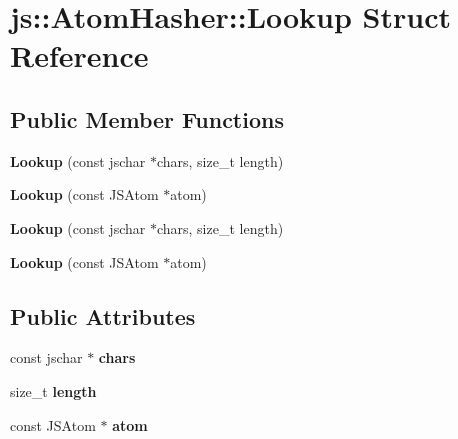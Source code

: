 \hypertarget{structjs_1_1_atom_hasher_1_1_lookup}{\section{js\-:\-:Atom\-Hasher\-:\-:Lookup Struct Reference}
\label{structjs_1_1_atom_hasher_1_1_lookup}
}
\subsection*{Public Member Functions}
\begin{DoxyCompactItemize}
\item 
\hypertarget{structjs_1_1_atom_hasher_1_1_lookup_a54651b30d62318bdf125726fd1abd328}{{\bfseries Lookup} (const jschar $\ast$chars, size\-\_\-t length)}\label{structjs_1_1_atom_hasher_1_1_lookup_a54651b30d62318bdf125726fd1abd328}

\item 
\hypertarget{structjs_1_1_atom_hasher_1_1_lookup_a5d4fc4135648abd0155831e954806b1c}{{\bfseries Lookup} (const J\-S\-Atom $\ast$atom)}\label{structjs_1_1_atom_hasher_1_1_lookup_a5d4fc4135648abd0155831e954806b1c}

\item 
\hypertarget{structjs_1_1_atom_hasher_1_1_lookup_a54651b30d62318bdf125726fd1abd328}{{\bfseries Lookup} (const jschar $\ast$chars, size\-\_\-t length)}\label{structjs_1_1_atom_hasher_1_1_lookup_a54651b30d62318bdf125726fd1abd328}

\item 
\hypertarget{structjs_1_1_atom_hasher_1_1_lookup_a5d4fc4135648abd0155831e954806b1c}{{\bfseries Lookup} (const J\-S\-Atom $\ast$atom)}\label{structjs_1_1_atom_hasher_1_1_lookup_a5d4fc4135648abd0155831e954806b1c}

\end{DoxyCompactItemize}
\subsection*{Public Attributes}
\begin{DoxyCompactItemize}
\item 
\hypertarget{structjs_1_1_atom_hasher_1_1_lookup_a79e261b0cb224c98b1964c40e70855ed}{const jschar $\ast$ {\bfseries chars}}\label{structjs_1_1_atom_hasher_1_1_lookup_a79e261b0cb224c98b1964c40e70855ed}

\item 
\hypertarget{structjs_1_1_atom_hasher_1_1_lookup_a76ecf62855ffcb08ab5363bc06337a19}{size\-\_\-t {\bfseries length}}\label{structjs_1_1_atom_hasher_1_1_lookup_a76ecf62855ffcb08ab5363bc06337a19}

\item 
\hypertarget{structjs_1_1_atom_hasher_1_1_lookup_ab012d67217f788f7596e274d29477093}{const J\-S\-Atom $\ast$ {\bfseries atom}}\label{structjs_1_1_atom_hasher_1_1_lookup_ab012d67217f788f7596e274d29477093}

\end{DoxyCompactItemize}


